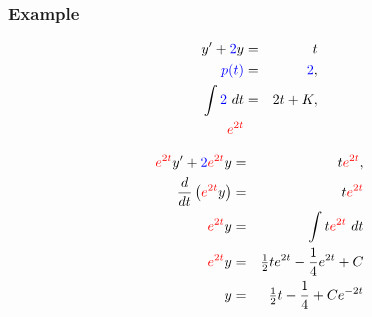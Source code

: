 \begin{frame}
  \frametitle{Example}

  \vspace*{-3em}
  \begin{eqnarray*}
    y' + {\color{blue}2}y & = & t \\
    {\color{blue}p(t)} & = & {\color{blue}2}, \\
    \int {\color{blue}2} ~ dt & = & 2t + K, \\
    {\color{red}e^{2t}} & &
  \end{eqnarray*}

  \begin{eqnarray*}
    {\color{red}e^{2t}} y' + {\color{blue}2} {\color{red}e^{2t}} y & = & t {\color{red}e^{2t}}, \\
    \frac{d}{dt} \left( {\color{red}e^{2t}} y \right) & = & t {\color{red}e^{2t}} \\
    {\color{red}e^{2t}} y & = & \int t {\color{red}e^{2t}} ~ dt \\
    {\color{red}e^{2t}} y & = & \mbox{$\frac{1}{2}$} t e^{2t} - \frac{1}{4} e^{2t} + C \\
    y & = & \mbox{$\frac{1}{2}$} t - \frac{1}{4} + C e^{-2t}
  \end{eqnarray*}

\end{frame}


